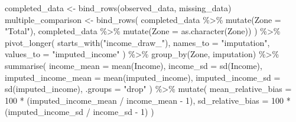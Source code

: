 \documentclass[
  spanish,
  11pt,
  letterpaper,
  oneside,
  open=any]{scrbook}
\newenvironment{Shaded}{\begin{snugshade}}{\end{snugshade}}
\newcommand{\AttributeTok}[1]{\textcolor[rgb]{0.40,0.45,0.13}{#1}}
\newcommand{\DecValTok}[1]{\textcolor[rgb]{0.68,0.00,0.00}{#1}}
\newcommand{\FunctionTok}[1]{\textcolor[rgb]{0.28,0.35,0.67}{#1}}
\newcommand{\NormalTok}[1]{\textcolor[rgb]{0.00,0.23,0.31}{#1}}
\newcommand{\OtherTok}[1]{\textcolor[rgb]{0.00,0.23,0.31}{#1}}
\newcommand{\SpecialCharTok}[1]{\textcolor[rgb]{0.37,0.37,0.37}{#1}}
\newcommand{\StringTok}[1]{\textcolor[rgb]{0.13,0.47,0.30}{#1}}
\begin{document}
\begin{Shaded}
\begin{Highlighting}[]
\NormalTok{completed\_data }\OtherTok{\textless{}{-}} \FunctionTok{bind\_rows}\NormalTok{(observed\_data, missing\_data)}
\NormalTok{multiple\_comparison }\OtherTok{\textless{}{-}} \FunctionTok{bind\_rows}\NormalTok{(}
\NormalTok{  completed\_data }\SpecialCharTok{\%\textgreater{}\%}
    \FunctionTok{mutate}\NormalTok{(}\AttributeTok{Zone =} \StringTok{"Total"}\NormalTok{),}
\NormalTok{  completed\_data }\SpecialCharTok{\%\textgreater{}\%}
    \FunctionTok{mutate}\NormalTok{(}\AttributeTok{Zone =} \FunctionTok{as.character}\NormalTok{(Zone))}
\NormalTok{) }\SpecialCharTok{\%\textgreater{}\%}
  \FunctionTok{pivot\_longer}\NormalTok{(}
    \FunctionTok{starts\_with}\NormalTok{(}\StringTok{"income\_draw\_"}\NormalTok{),}
    \AttributeTok{names\_to =} \StringTok{"imputation"}\NormalTok{,}
    \AttributeTok{values\_to =} \StringTok{"imputed\_income"}
\NormalTok{  ) }\SpecialCharTok{\%\textgreater{}\%}
  \FunctionTok{group\_by}\NormalTok{(Zone, imputation) }\SpecialCharTok{\%\textgreater{}\%}
  \FunctionTok{summarise}\NormalTok{(}
    \AttributeTok{income\_mean =} \FunctionTok{mean}\NormalTok{(Income),}
    \AttributeTok{income\_sd =} \FunctionTok{sd}\NormalTok{(Income),}
    \AttributeTok{imputed\_income\_mean =} \FunctionTok{mean}\NormalTok{(imputed\_income),}
    \AttributeTok{imputed\_income\_sd =} \FunctionTok{sd}\NormalTok{(imputed\_income),}
    \AttributeTok{.groups =} \StringTok{"drop"}
\NormalTok{  ) }\SpecialCharTok{\%\textgreater{}\%}
  \FunctionTok{mutate}\NormalTok{(}
    \AttributeTok{mean\_relative\_bias =} \DecValTok{100} \SpecialCharTok{*}\NormalTok{ (imputed\_income\_mean }\SpecialCharTok{/}\NormalTok{ income\_mean }\SpecialCharTok{{-}} \DecValTok{1}\NormalTok{),}
    \AttributeTok{sd\_relative\_bias =} \DecValTok{100} \SpecialCharTok{*}\NormalTok{ (imputed\_income\_sd }\SpecialCharTok{/}\NormalTok{ income\_sd }\SpecialCharTok{{-}} \DecValTok{1}\NormalTok{)}
\NormalTok{  )}
\end{Highlighting}
\end{Shaded}
\end{document}
